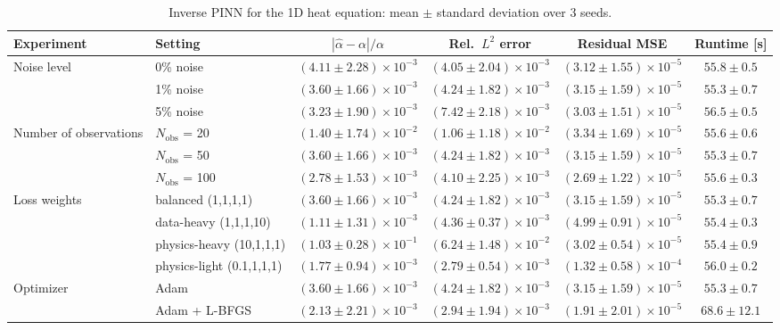 \begin{table}[htbp]
\centering
\small
\caption{Inverse PINN for the 1D heat equation: mean $\pm$ standard deviation over 3 seeds.}
\label{tab:inverse-pinn-heat}
\begin{tabular}{llcccc}
\toprule
Experiment & Setting & $|\hat\alpha-\alpha|/\alpha$ & Rel.\ $L^2$ error & Residual MSE & Runtime [s] \\
\midrule
Noise level & 0\% noise & $(4.11 \pm 2.28)\times 10^{-3}$ & $(4.05 \pm 2.04)\times 10^{-3}$ & $(3.12 \pm 1.55)\times 10^{-5}$ & $55.8 \pm 0.5$ \\
 & 1\% noise & $(3.60 \pm 1.66)\times 10^{-3}$ & $(4.24 \pm 1.82)\times 10^{-3}$ & $(3.15 \pm 1.59)\times 10^{-5}$ & $55.3 \pm 0.7$ \\
 & 5\% noise & $(3.23 \pm 1.90)\times 10^{-3}$ & $(7.42 \pm 2.18)\times 10^{-3}$ & $(3.03 \pm 1.51)\times 10^{-5}$ & $56.5 \pm 0.5$ \\
\midrule
Number of observations & $N_{\mathrm{obs}}$ = 20 & $(1.40 \pm 1.74)\times 10^{-2}$ & $(1.06 \pm 1.18)\times 10^{-2}$ & $(3.34 \pm 1.69)\times 10^{-5}$ & $55.6 \pm 0.6$ \\
 & $N_{\mathrm{obs}}$ = 50 & $(3.60 \pm 1.66)\times 10^{-3}$ & $(4.24 \pm 1.82)\times 10^{-3}$ & $(3.15 \pm 1.59)\times 10^{-5}$ & $55.3 \pm 0.7$ \\
 & $N_{\mathrm{obs}}$ = 100 & $(2.78 \pm 1.53)\times 10^{-3}$ & $(4.10 \pm 2.25)\times 10^{-3}$ & $(2.69 \pm 1.22)\times 10^{-5}$ & $55.6 \pm 0.3$ \\
\midrule
Loss weights & balanced (1,1,1,1) & $(3.60 \pm 1.66)\times 10^{-3}$ & $(4.24 \pm 1.82)\times 10^{-3}$ & $(3.15 \pm 1.59)\times 10^{-5}$ & $55.3 \pm 0.7$ \\
 & data-heavy (1,1,1,10) & $(1.11 \pm 1.31)\times 10^{-3}$ & $(4.36 \pm 0.37)\times 10^{-3}$ & $(4.99 \pm 0.91)\times 10^{-5}$ & $55.4 \pm 0.3$ \\
 & physics-heavy (10,1,1,1) & $(1.03 \pm 0.28)\times 10^{-1}$ & $(6.24 \pm 1.48)\times 10^{-2}$ & $(3.02 \pm 0.54)\times 10^{-5}$ & $55.4 \pm 0.9$ \\
 & physics-light (0.1,1,1,1) & $(1.77 \pm 0.94)\times 10^{-3}$ & $(2.79 \pm 0.54)\times 10^{-3}$ & $(1.32 \pm 0.58)\times 10^{-4}$ & $56.0 \pm 0.2$ \\
\midrule
Optimizer & Adam & $(3.60 \pm 1.66)\times 10^{-3}$ & $(4.24 \pm 1.82)\times 10^{-3}$ & $(3.15 \pm 1.59)\times 10^{-5}$ & $55.3 \pm 0.7$ \\
 & Adam + L-BFGS & $(2.13 \pm 2.21)\times 10^{-3}$ & $(2.94 \pm 1.94)\times 10^{-3}$ & $(1.91 \pm 2.01)\times 10^{-5}$ & $68.6 \pm 12.1$ \\
\bottomrule
\end{tabular}
\end{table}
